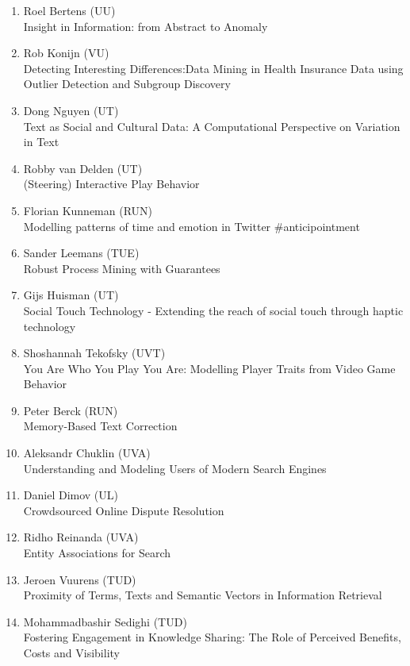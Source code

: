 \begin{multicols}{2}
\begin{scriptsize}
\begin{enumerate}[label=\textbf{2017-\arabic*},leftmargin=0cm,itemindent=1.15cm,labelwidth=\itemindent,labelsep=0cm,align=left,noitemsep]
\item Roel Bertens (UU)     \\
	Insight in Information: from Abstract to Anomaly
\item Rob Konijn (VU)    \\
	Detecting Interesting Differences:Data Mining in Health Insurance Data using Outlier Detection and Subgroup Discovery
\item Dong Nguyen (UT)     \\
	Text as Social and Cultural Data: A Computational Perspective on Variation in Text 
\item Robby van Delden (UT)    \\
	(Steering) Interactive Play Behavior
\item Florian Kunneman (RUN)     \\
	Modelling patterns of time and emotion in Twitter \#anticipointment 
\item Sander Leemans (TUE)    \\
	Robust Process Mining with Guarantees 
\item Gijs Huisman (UT)     \\
	Social Touch Technology - Extending the reach of social touch through haptic technology 
\item Shoshannah Tekofsky (UVT)   \\
	You Are Who You Play You Are: Modelling Player Traits from Video Game Behavior 
\item Peter Berck (RUN)     \\
	Memory-Based Text Correction 
\item Aleksandr Chuklin (UVA)    \\
	Understanding and Modeling Users of Modern Search Engines 
\item Daniel Dimov (UL)    \\
	Crowdsourced Online Dispute Resolution 
\item Ridho Reinanda (UVA)     \\
	Entity Associations for Search 
\item Jeroen Vuurens (TUD)    \\
	Proximity of Terms, Texts and Semantic Vectors in Information Retrieval 
\item Mohammadbashir Sedighi (TUD)     \\
	Fostering Engagement in Knowledge Sharing: The Role of Perceived Benefits, Costs and Visibility 
	

\end{enumerate}
\end{scriptsize}
\end{multicols}
